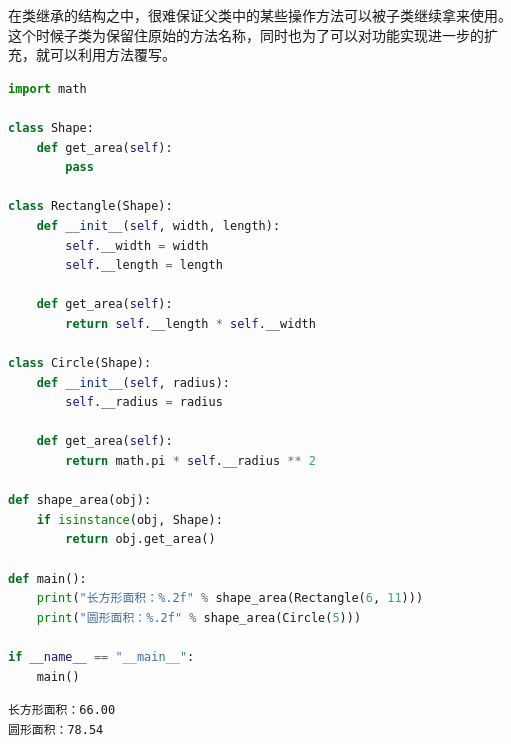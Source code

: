 在类继承的结构之中，很难保证父类中的某些操作方法可以被子类继续拿来使用。这个时候子类为保留住原始的方法名称，同时也为了可以对功能实现进一步的扩充，就可以利用方法覆写。\\


\begin{lstlisting}[language=Python]
import math

class Shape:
    def get_area(self):
        pass

class Rectangle(Shape):
    def __init__(self, width, length):
        self.__width = width
        self.__length = length
    
    def get_area(self):
        return self.__length * self.__width

class Circle(Shape):
    def __init__(self, radius):
        self.__radius = radius
    
    def get_area(self):
        return math.pi * self.__radius ** 2

def shape_area(obj):
    if isinstance(obj, Shape):
        return obj.get_area()

def main():
    print("长方形面积：%.2f" % shape_area(Rectangle(6, 11)))
    print("圆形面积：%.2f" % shape_area(Circle(5)))

if __name__ == "__main__":
    main()
\end{lstlisting}

\begin{tcolorbox}
	\begin{verbatim}
长方形面积：66.00
圆形面积：78.54
\end{verbatim}
\end{tcolorbox}

\newpage